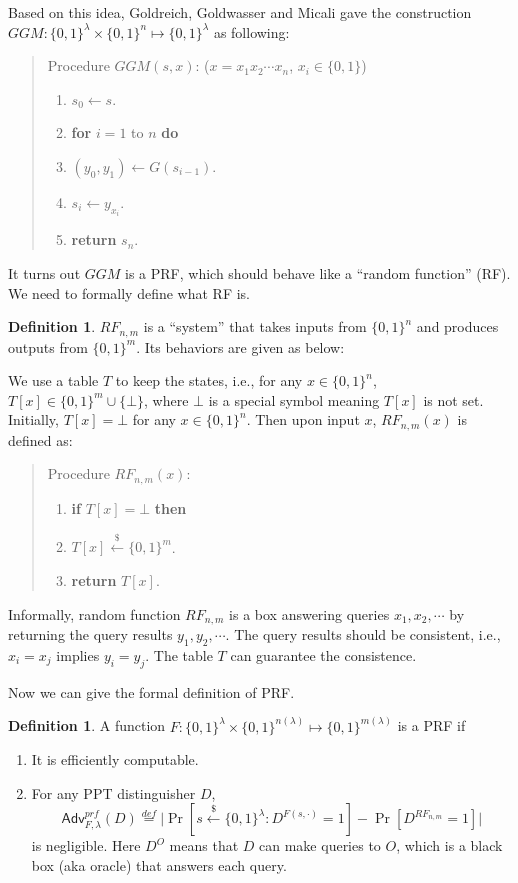 \documentclass[12pt]{article}
\newcommand{\eqdef}{\stackrel{def}{=}}
\newcommand{\bits}{\{0,1\}}
\newcommand{\getsr}{\stackrel{\$}{\gets}}
\newcommand{\Adv}{\mathsf{Adv}}
\newcommand{\tab}{\hspace{0.3in}}
\theoremstyle{definition}
\newtheorem{definition}[theorem]{Definition}
\begin{document}
Based on this idea, Goldreich, Goldwasser and Micali \cite{GGM86} gave the construction $GGM : \bits^\lambda \times \bits^n \mapsto \bits^\lambda$ as following:
\begin{quote}
Procedure $GGM(s,x)$: ($x=x_1x_2\cdots x_n$, $x_i\in\bits$)
\begin{enumerate}
\item $s_0 \gets s$.
\item {\bf for} $i=1$ to $n$ {\bf do}
\item \tab $(y_0, y_1) \gets G(s_{i-1})$.
\item \tab $s_i \gets y_{x_i}$.
\item {\bf return} $s_n$.
\end{enumerate}
\end{quote}
It turns out $GGM$ is a PRF, which should behave like a ``random function'' (RF). We need to formally define what RF is.
\begin{definition}
$RF_{n,m}$ is a ``system'' that takes inputs from $\bits^n$ and produces outputs from $\bits^m$. Its behaviors are given as below:

We use a table $T$ to keep the states, i.e., for any $x\in\bits^n$, $T[x] \in \bits^m \cup \{\bot\}$, where $\bot$ is a special symbol meaning $T[x]$ is not set. Initially, $T[x] = \bot$ for any $x\in\bits^n$. Then upon input $x$, $RF_{n,m}(x)$ is defined as:
\begin{quote}
Procedure $RF_{n,m}(x)$:
\begin{enumerate}
\item {\bf if} $T[x] = \bot$ {\bf then}
\item \tab $T[x] \getsr \bits^m$.
\item {\bf return} $T[x]$.
\end{enumerate}
\end{quote}
\end{definition}
Informally, random function $RF_{n,m}$ is a box answering queries $x_1,x_2,\cdots$ by returning the query results $y_1,y_2,\cdots$. The query results should be consistent, i.e., $x_i = x_j$ implies $y_i = y_j$. The table $T$ can guarantee the consistence.

Now we can give the formal definition of PRF.
\begin{definition}
A function $F : \bits^\lambda \times \bits^{n(\lambda)} \mapsto \bits^{m(\lambda)}$ is a PRF if
\begin{enumerate}
\item It is efficiently computable.
\item For any PPT distinguisher $D$,
$$\Adv_{F,\lambda}^{prf}(D) \eqdef \bigg| \Pr[s \getsr \bits^\lambda: D^{F(s,\cdot)}=1] - \Pr[D^{RF_{n,m}}=1] \bigg|$$
is negligible. Here $D^{O}$ means that $D$ can make queries to $O$, which is a black box (aka oracle) that answers each query. 
\end{enumerate}
\end{definition}
\end{document}
